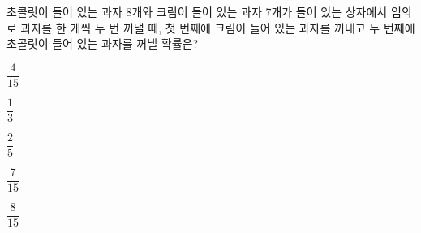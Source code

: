 초콜릿이 들어 있는 과자 8개와 크림이 들어 있는 과자 7개가 들어 있는 상자에서 임의로 과자를 한 개씩 두 번 꺼낼 때, 첫 번째에 크림이 들어 있는 과자를 꺼내고 두 번째에 초콜릿이 들어 있는 과자를 꺼낼 확률은? 
\begin{choicesii}{\rule[-3ex]{0pt}{8ex}$\dfrac{4}{15}$}{\rule[-3ex]{0pt}{8ex}$\dfrac{1}{3}$}{\rule[-3ex]{0pt}{8ex}$\dfrac{2}{5}$}{\rule[-3ex]{0pt}{8ex}$\dfrac{7}{15}$}{\rule[-3ex]{0pt}{8ex}$\dfrac{8}{15}$}\end{choicesii}
